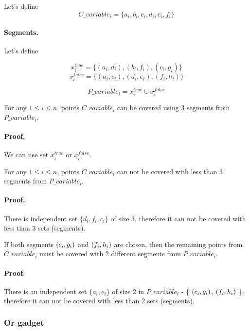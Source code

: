 Let's define $$C\_variable_i =  \{a_i, b_i, c_i, d_i, e_i, f_i\}$$	


\paragraph{Segments.}

Let's define 

$$x^{true}_i =\{ (a_i, d_i), (b_i, f_i), (c_i, g_i)\}$$
$$x^{false}_i = \{(a_i, c_i), (d_i, e_i), (f_i, h_i)\}$$

$$P\_variable_i = x^{true}_i \cup x^{false}_i$$


\begin{lemma}
\label{choose_variables_solution}
For any $1 \le i \le n$, points $C\_variable_i$
can be covered using 3 segments from $P\_variable_i$.
\end{lemma}

\paragraph{Proof.}
We can use set $x^{true}_i$ or $x^{false}_i$.


\begin{lemma}
\label{choose_variables_no_less}
For any $1 \le i \le n$, points $C\_variable_i$
can not be covered with less than 3 segments from $P\_variable_i$.
\end{lemma}

\paragraph{Proof.}
There is independent set $\{d_i, f_i, c_i\}$ of size 3, therefore it can
not be covered with less than 3 sets (segments).


\begin{lemma}
\label{choose_variables_both}
If both segments $(c_i, g_i)$ and $(f_i, h_i)$ are chosen, then
the remaining points from $C\_variable_i$ must be covered with 2 different
segments from $P\_variable_i$.
\end{lemma}
\paragraph{Proof.}
There is an independent set $\{a_i, e_i\}$ of size 2
in $P\_variable_i$ - \{ $(c_i, g_i)$, $(f_i, h_i)$ \},
therefore it can not be covered with less than 2 sets (segments).


\subsubsection{Or gadget}


